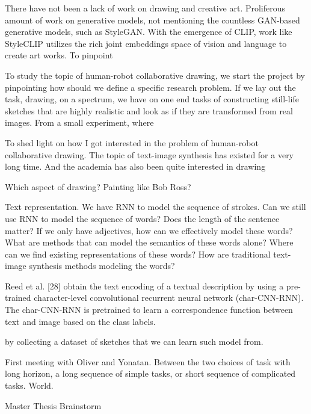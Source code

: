 There have not been a lack of work on drawing and creative art. Proliferous amount of work on generative models, not mentioning the countless GAN-based generative models, such as StyleGAN. With the emergence of CLIP, work like StyleCLIP utilizes the rich joint embeddings space of vision and language to create art works. To pinpoint 

To study the topic of human-robot collaborative drawing, we start the project by pinpointing how should we define a specific research problem. If we lay out the task, drawing, on a spectrum, we have on one end tasks of constructing still-life sketches that are highly realistic and look as if they are transformed from real images. From a small experiment, where  



To shed light on how I got interested in the problem of human-robot collaborative drawing. The topic of text-image synthesis has existed for a very long time. And the academia has also been quite interested in drawing 

Which aspect of drawing? Painting like Bob Ross? 

Text representation. 
We have RNN to model the sequence of strokes. Can we still use RNN to model the sequence of words? Does the length of the sentence matter? If we only have adjectives, how can we effectively model these words? What are methods that can model the semantics of these words alone? Where can we find existing representations of these words? How are traditional text-image synthesis methods modeling the words? 

Reed et al. [28] obtain the text encoding of a textual description by using a pre-trained character-level convolutional recurrent neural network (char-CNN-RNN). The char-CNN-RNN is pretrained to learn a correspondence function between text and image based on the class labels. 


by collecting a dataset of sketches that we can learn such model from. 

First meeting with Oliver and Yonatan. 
Between the two choices of task with long horizon, a long sequence of simple tasks, or short sequence of complicated tasks. 
World. 


Master Thesis Brainstorm

